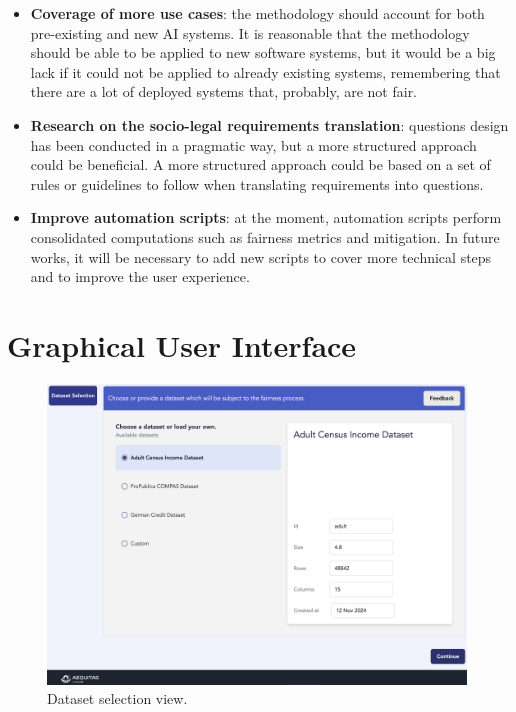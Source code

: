 \documentclass[12pt,a4paper,openright,twoside]{book}
\begin{document}
\begin{itemize}
    \item \textbf{Coverage of more use cases}: the methodology should account for both pre-existing and new \ac{AI} systems.
    It is reasonable that the methodology should be able to be applied to new software systems, but it would be a big lack if it could not be applied to already existing systems, remembering that there are a lot of deployed systems that, probably, are not fair.

    \item \textbf{Research on the socio-legal requirements translation}: questions design has been conducted in a pragmatic way, but a more structured approach could be beneficial.
    A more structured approach could be based on a set of rules or guidelines to follow when translating requirements into questions.

    \item \textbf{Improve automation scripts}: at the moment, automation scripts perform consolidated computations such as fairness metrics and mitigation.
    In future works, it will be necessary to add new scripts to cover more technical steps and to improve the user experience.
\end{itemize}


\appendix


\chapter{Graphical User Interface}\label{app:gui}

\begin{figure}
    \centering
    \includegraphics[width=0.99\textwidth]{figures/gui/dataset-selection.png}
    \caption{Dataset selection view.}
    \label{fig:dataset-selection}
\end{figure}
\end{document}
